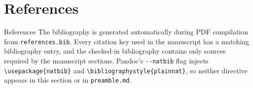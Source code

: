 \documentclass[
  ignorenonframetext,
]{beamer}
\author{}
\date{}
\begin{document}
\section{References}\label{references}

\begin{frame}{References}
The bibliography is generated automatically during PDF compilation from
\texttt{references.bib}. Every citation key used in the manuscript has a
matching bibliography entry, and the checked-in bibliography contains
only sources required by the manuscript sections. Pandoc's
\texttt{-\/-natbib} flag injects
\texttt{\textbackslash{}usepackage\{natbib\}} and
\texttt{\textbackslash{}bibliographystyle\{plainnat\}}, so neither
directive appears in this section or in \texttt{preamble.md}.


\end{frame}
\end{document}
